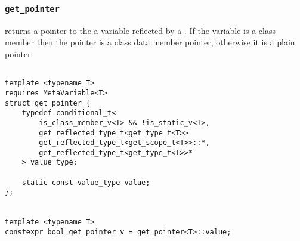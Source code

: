 
\subsubsection{\texttt{get\_pointer}}

returns a pointer to the a variable reflected by a .   If the variable is a class member then the pointer is a class data member pointer,   otherwise it is a plain pointer.

\begin{verbatim}

template <typename T>
requires MetaVariable<T>
struct get_pointer {
	typedef conditional_t<
		is_class_member_v<T> && !is_static_v<T>,
		get_reflected_type_t<get_type_t<T>>
		get_reflected_type_t<get_scope_t<T>>::*,
		get_reflected_type_t<get_type_t<T>>*
	> value_type;

	static const value_type value;
};


template <typename T>
constexpr bool get_pointer_v = get_pointer<T>::value;

\end{verbatim}
